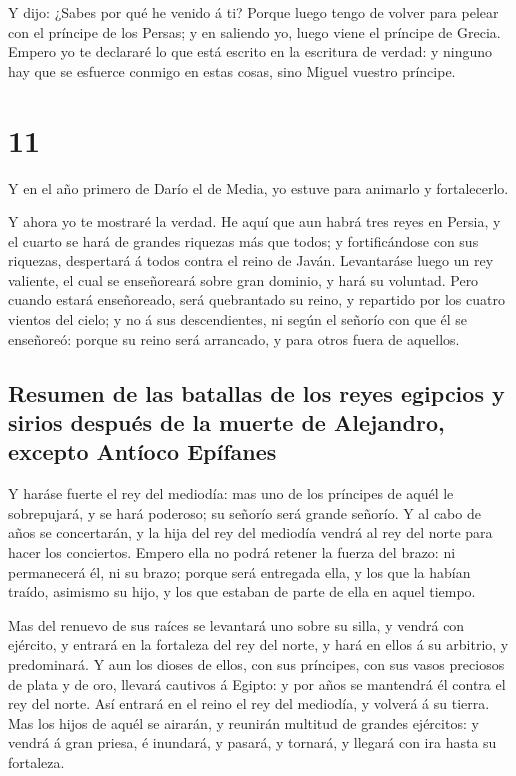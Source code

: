  Y dijo: ¿Sabes por qué he venido á ti? Porque luego
tengo de volver para pelear con el príncipe de los Persas; y en saliendo
yo, luego viene el príncipe de Grecia.  Empero yo te
declararé lo que está escrito en la escritura de verdad: y ninguno hay
que se esfuerce conmigo en estas cosas, sino Miguel vuestro príncipe.

\hypertarget{section-10}{%
\section{11}\label{section-10}}

 Y en el año primero de Darío el de Media, yo estuve para
animarlo y fortalecerlo.

 Y ahora yo te mostraré la verdad. He aquí que aun habrá
tres reyes en Persia, y el cuarto se hará de grandes riquezas más que
todos; y fortificándose con sus riquezas, despertará á todos contra el
reino de Javán.  Levantaráse luego un rey valiente, el
cual se enseñoreará sobre gran dominio, y hará su voluntad.
 Pero cuando estará enseñoreado, será quebrantado su
reino, y repartido por los cuatro vientos del cielo; y no á sus
descendientes, ni según el señorío con que él se enseñoreó: porque su
reino será arrancado, y para otros fuera de aquellos.

\hypertarget{resumen-de-las-batallas-de-los-reyes-egipcios-y-sirios-despuuxe9s-de-la-muerte-de-alejandro-excepto-antuxedoco-epuxedfanes}{%
\subsection{Resumen de las batallas de los reyes egipcios y sirios
después de la muerte de Alejandro, excepto Antíoco
Epífanes}\label{resumen-de-las-batallas-de-los-reyes-egipcios-y-sirios-despuuxe9s-de-la-muerte-de-alejandro-excepto-antuxedoco-epuxedfanes}}

 Y haráse fuerte el rey del mediodía: mas uno de los
príncipes de aquél le sobrepujará, y se hará poderoso; su señorío será
grande señorío.  Y al cabo de años se concertarán, y la
hija del rey del mediodía vendrá al rey del norte para hacer los
conciertos. Empero ella no podrá retener la fuerza del brazo: ni
permanecerá él, ni su brazo; porque será entregada ella, y los que la
habían traído, asimismo su hijo, y los que estaban de parte de ella en
aquel tiempo.

 Mas del renuevo de sus raíces se levantará uno sobre su
silla, y vendrá con ejército, y entrará en la fortaleza del rey del
norte, y hará en ellos á su arbitrio, y predominará.  Y
aun los dioses de ellos, con sus príncipes, con sus vasos preciosos de
plata y de oro, llevará cautivos á Egipto: y por años se mantendrá él
contra el rey del norte.  Así entrará en el reino el rey
del mediodía, y volverá á su tierra.  Mas los hijos de
aquél se airarán, y reunirán multitud de grandes ejércitos: y vendrá á
gran priesa, é inundará, y pasará, y tornará, y llegará con ira hasta su
fortaleza.


